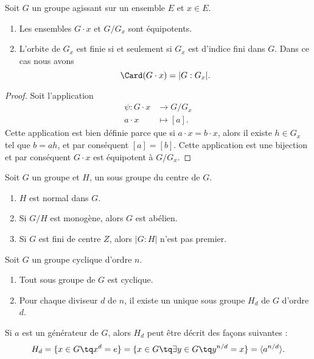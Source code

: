 \begin{proposition}
    Soit \( G\) un groupe agissant sur un ensemble \( E\) et \( x\in E\).
    \begin{enumerate}
        \item
            Les ensembles \( G\cdot x\) et \( G/G_x\) sont équipotents.
        \item
            L'orbite de \( G_x\) est finie si et seulement si \( G_x\) est d'indice fini dans \( G\). Dans ce cas nous avons 
            \begin{equation}
                \Card(G\cdot x)=| G:G_x |.
            \end{equation}
    \end{enumerate}
\end{proposition}

\begin{proof}
    Soit l'application
    \begin{equation}
        \begin{aligned}
            \psi\colon G\cdot x&\to G/G_x \\
            a\cdot x&\mapsto [a]. 
        \end{aligned}
    \end{equation}
    Cette application est bien définie parce que si \( a\cdot x=b\cdot x\), alors il existe \( h\in G_x\) tel que \( b=ah\), et par conséquent \( [a]=[b]\). Cette application est une bijection et par conséquent \( G\cdot x\) est équipotent à \( G/G_x\).
\end{proof}

\begin{proposition}
    Soit \( G\) un groupe et \( H\), un sous groupe du centre de \( G\).
    \begin{enumerate}
        \item
            \( H\) est normal dans \( G\).
        \item
            Si \( G/H\) est monogène, alors \( G\) est abélien.
        \item
            Si \( G\) est fini de centre \( Z\), alors \( | G:H |\) n'est pas premier.
    \end{enumerate}
\end{proposition}

\begin{theorem}
    Soit \( G\) un groupe cyclique d'ordre \( n\).
    \begin{enumerate}
        \item
            Tout sous groupe de \( G\) est cyclique.
        \item 
            Pour chaque diviseur \( d\) de \( n\), il existe un unique sous groupe \( H_d\) de \( G\) d'ordre \( d\).
    \end{enumerate}
    Si \( a\) est un générateur de \( G\), alors \( H_d\) peut être décrit des façons suivantes :
    \begin{equation}
        H_d=\{ x\in G\tq x^d=e \}=\{ x\in G\tq\exists y\in G\tq y^{n/d}=x \}=\langle a^{n/d}\rangle.
    \end{equation}
\end{theorem}

